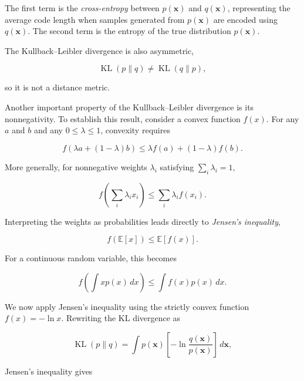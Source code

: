 \documentclass[10pt,twocolumn]{memoir}
\begin{document}
The first term is the \textit{cross-entropy} between $p(\mathbf{x})$ and $q(\mathbf{x})$, representing the average code length when samples generated from $p(\mathbf{x})$ are encoded using $q(\mathbf{x})$. The second term is the entropy of the true distribution $p(\mathbf{x})$.

The Kullback--Leibler divergence is also asymmetric,

\begin{equation}
    \operatorname{KL}(p\|q) \neq \operatorname{KL}(q\|p),
\end{equation}

so it is not a distance metric.

Another important property of the Kullback--Leibler divergence is its nonnegativity. To establish this result, consider a convex function $f(x)$. For any $a$ and $b$ and any $0\leq\lambda\leq 1$, convexity requires

\begin{equation}
    f\left(\lambda a+(1-\lambda)b\right)\leq\lambda f(a)+(1-\lambda)f(b).
\end{equation}

More generally, for nonnegative weights $\lambda_i$ satisfying $\sum_i\lambda_i=1$,

\begin{equation}
    f\left(\sum_i\lambda_i x_i\right)\leq\sum_i\lambda_i f(x_i).
\end{equation}

Interpreting the weights as probabilities leads directly to \textit{Jensen's inequality},

\begin{equation}
    f\left(\mathbb{E}[x]\right)
    \leq
    \mathbb{E}[f(x)].
\end{equation}

For a continuous random variable, this becomes

\begin{equation}
    f\left(\int x p(x)\,dx\right)\leq\int f(x)p(x)\,dx.
\end{equation}

We now apply Jensen's inequality using the strictly convex function $f(x)=-\ln x$. Rewriting the KL divergence as

\begin{equation}
    \operatorname{KL}(p\|q) = \int p(\mathbf{x})\left[-\ln\frac{q(\mathbf{x})}{p(\mathbf{x})}\right]\,d\mathbf{x},
\end{equation}

Jensen's inequality gives
\end{document}
